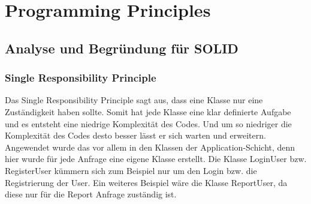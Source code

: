 


\chapter{Programming Principles}
\section{Analyse und Begründung für SOLID}

\subsection{Single Responsibility Principle}
Das Single Responsibility Principle sagt aus, dass eine Klasse nur eine Zuständigkeit haben sollte.
Somit hat jede Klasse eine klar definierte Aufgabe und es entsteht eine niedrige Komplexität des Codes.
Und um so niedriger die Komplexität des Codes desto besser lässt er sich warten und erweitern.
Angewendet wurde das vor allem in den Klassen der Application-Schicht, denn hier wurde für jede Anfrage eine eigene Klasse erstellt.
Die Klasse LoginUser bzw. RegisterUser kümmern sich zum Beispiel nur um den Login bzw. die Registrierung der User.
Ein weiteres Beispiel wäre die Klasse ReportUser, da diese nur für die Report Anfrage zuständig ist.


